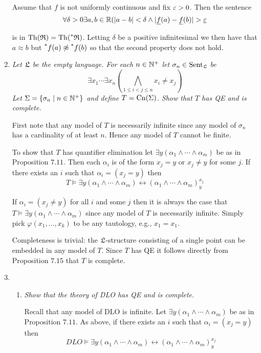 \documentclass[10pt]{article}
\begin{document}
\begin{enumerate}
Assume that $f$ is not uniformly continuous and fix $\varepsilon > 0$.  Then the sentence
\[
\forall \delta > 0 \exists a,b \in \mathbb{R} (|a-b| < \delta \land |\underline{f}(a) - \underline{f}(b)| > \underline{\varepsilon} 
\]

is in $\Th(\mathfrak{R}) = \Th(\leftexp{\ast}{\mathfrak{R}})$.  Letting $\delta$ be a positive infinitesimal we then have that $a \approx b$ but $\leftexp{\ast}{f(a)} \not\approx \leftexp{\ast}{f(b)}$ so that the second property does not hold.

\item \emph{Let $\mathfrak{L}$ be the empty language.  For each $n \in \mathbb{N}^+$ let $\sigma_n \in \operatorname{Sent}_{\mathfrak{L}}$ be $$\exists x_1 \cdots \exists x_n \left( \bigwedge_{1 \leq i < j \leq n} x_i \neq x_j\right)$$ Let $\Sigma = \left\{ \sigma_n \mid n \in \mathbb{N}^+ \right\}$ and define $T = \operatorname{Cn}(\Sigma)$.  Show that $T$ has QE and is complete.}

First note that any model of $T$ is necessarily infinite since any model of $\sigma_n$ has a cardinality of at least $n$.  Hence any model of $T$ cannot be finite.

To show that $T$ has quantifier elimination let $\exists y(\alpha_1 \land \cdots \land \alpha_m)$ be as in Proposition $7.11$.  Then each $\alpha_i$ is of the form $x_j = y$ or $x_j \neq y$ for some $j$.  If there exists an $i$ such that $\alpha_i = (x_j = y)$ then
\[
T \vDash \exists y(\alpha_1 \land \cdots \land \alpha_m) \leftrightarrow (\alpha_1 \land \cdots \land \alpha_m)^{x_j}_y
\]

If $\alpha_i = (x_j \neq y)$ for all $i$ and some $j$ then it is always the case that $T \vDash \exists y(\alpha_1 \land \cdots \land \alpha_m)$ since any model of $T$ is necessarily infinite.  Simply pick $\varphi(x_1, \ldots, x_k)$ to be any tautology, e.g., $x_1 = x_1$.

Completeness is trivial: the $\mathfrak{L}$-structure consisting of a single point can be embedded in any model of $T$.  Since $T$ has QE it follows directly from Proposition $7.15$ that $T$ is complete.
\item
\begin{enumerate}
\item \emph{Show that the theory of DLO has QE and is complete.}

Recall that any model of DLO is infinite.  Let $\exists y(\alpha_1 \land \cdots \land \alpha_m)$ be as in Proposition $7.11$.  As above, if there exists an $i$ such that $\alpha_i = (x_j = y)$ then
\[
DLO \vDash \exists y(\alpha_1 \land \cdots \land \alpha_m) \leftrightarrow (\alpha_1 \land \cdots \land \alpha_m)^{x_j}_y
\]


\end{enumerate}
\end{enumerate}
\end{document}
